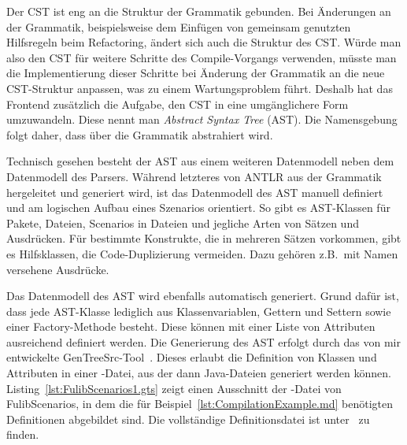 Der CST ist eng an die Struktur der Grammatik gebunden.
Bei Änderungen an der Grammatik, beispielsweise dem Einfügen von gemeinsam genutzten Hilfsregeln beim Refactoring, ändert sich auch die Struktur des CST\@.
Würde man also den CST für weitere Schritte des Compile-Vorgangs verwenden, müsste man die Implementierung dieser Schritte bei Änderung der Grammatik an die neue CST-Struktur anpassen, was zu einem Wartungsproblem führt.
Deshalb hat das Frontend zusätzlich die Aufgabe, den CST in eine umgänglichere Form umzuwandeln.
Diese nennt man \emph{Abstract Syntax Tree} (AST).
Die Namensgebung folgt daher, dass über die Grammatik abstrahiert wird.

Technisch gesehen besteht der AST aus einem weiteren Datenmodell neben dem Datenmodell des Parsers.
Während letzteres von ANTLR aus der Grammatik hergeleitet und generiert wird, ist das Datenmodell des AST manuell definiert und am logischen Aufbau eines Szenarios orientiert.
So gibt es AST-Klassen für Pakete, Dateien, Scenarios in Dateien und jegliche Arten von Sätzen und Ausdrücken.
Für bestimmte Konstrukte, die in mehreren Sätzen vorkommen, gibt es Hilfsklassen, die Code-Duplizierung vermeiden.
Dazu gehören z.B.\ mit Namen versehene Ausdrücke.

Das Datenmodell des AST wird ebenfalls automatisch generiert.
Grund dafür ist, dass jede AST-Klasse lediglich aus Klassenvariablen, Gettern und Settern sowie einer Factory-Methode besteht.
Diese können mit einer Liste von Attributen ausreichend definiert werden.
Die Generierung des AST erfolgt durch das von mir entwickelte GenTreeSrc-Tool~\cite{gentreesrc}.
Dieses erlaubt die Definition von Klassen und Attributen in einer -Datei, aus der dann Java-Dateien generiert werden können.
Listing~\ref{lst:FulibScenarios1.gts} zeigt einen Ausschnitt der -Datei von FulibScenarios, in dem die für Beispiel~\ref{lst:CompilationExample.md} benötigten Definitionen abgebildet sind.
Die vollständige Definitionsdatei ist unter~\cite{gts-definitions} zu finden.


